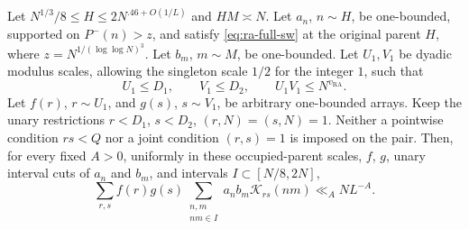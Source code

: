 \begin{lemma}\label{hyp:ra-l52}
Let \(N^{1/3}/8\le H\le2N^{.46+O(1/L)}\) and \(HM\asymp N\). Let \(a_n\),
\(n\sim H\), be one-bounded, supported on \(P^-(n)>z\), and satisfy
\eqref{eq:ra-full-sw} at the original parent \(H\), where
\(z=N^{1/(\log\log N)^3}\). Let \(b_m\), \(m\sim M\), be one-bounded.
Let \(U_1,V_1\) be dyadic modulus scales, allowing the singleton scale
\(1/2\) for the integer \(1\), such that
\[
 U_1\le D_1,\qquad V_1\le D_2,\qquad U_1V_1\le N^{v_{\mathrm{RA}}}.
\]
Let \(f(r)\), \(r\sim U_1\), and \(g(s)\), \(s\sim V_1\), be arbitrary
one-bounded arrays.
Keep the unary restrictions \(r<D_1\), \(s<D_2\),
\((r,N)=(s,N)=1\). Neither a pointwise condition \(rs<Q\) nor a joint condition
\((r,s)=1\) is imposed on the pair. Then, for every fixed \(A>0\), uniformly in these
occupied-parent scales, \(f\), \(g\), unary interval cuts of \(a_n\) and
\(b_m\), and intervals \(I\subset[N/8,2N]\),
\begin{equation}\label{eq:ra-l52-input}
 \sum_{r,s}f(r)g(s)
 \sum_{\substack{n,m\\nm\in I}}a_n b_m\mathcal K_{rs}(nm)\ll_A NL^{-A}.
\end{equation}
\end{lemma}
